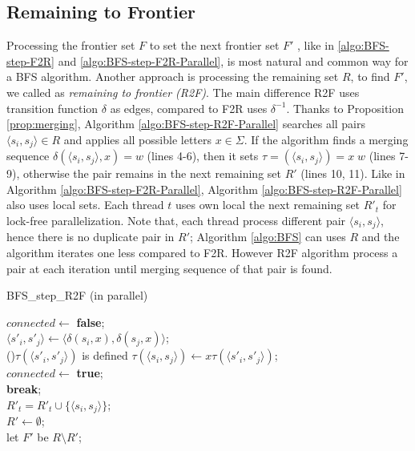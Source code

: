 \documentclass[12pt]{article}
\begin{document}
\subsection{Remaining to Frontier}
\label{sec:BFS-R2F-parallel}

Processing the frontier set $F$ to set the next frontier set $F'$ , like in \ref{algo:BFS-step-F2R} and \ref{algo:BFS-step-F2R-Parallel}, is most natural and common way for a BFS algorithm. Another approach is processing the remaining set $R$, to find $F'$, we called as \textit{remaining to frontier (R2F)}. The main difference R2F uses transition function $\delta$ as edges, compared to F2R uses $\delta^{-1}$. Thanks to Proposition \ref{prop:merging}, Algorithm \ref{algo:BFS-step-R2F-Parallel} searches all pairs $\langle s_i,s_j\rangle \in R$ and applies all possible letters $x \in \Sigma$. If the algorithm finds a merging sequence $\delta(\langle s_i,s_j\rangle, x) = w$ (lines 4-6), then it sets $\tau = (\langle s_i,s_j\rangle) = x \; w$ (lines 7-9), otherwise the pair remains in the next remaining set $R'$ (lines 10, 11). Like in Algorithm \ref{algo:BFS-step-F2R-Parallel}, Algorithm \ref{algo:BFS-step-R2F-Parallel} also uses local sets. Each thread $t$ uses own local the next remaining set $R'_t$ for lock-free parallelization. Note that, each thread process different pair $\langle s_i,s_j\rangle$, hence there is no duplicate pair in $R'$; Algorithm \ref{algo:BFS} can uses $R$ and the algorithm iterates one less compared to F2R. However R2F algorithm process a pair at each iteration until merging sequence of that pair is found.

\begin{algorithm}[ht]
	\label{algo:BFS-step-R2F-Parallel}
	\caption{BFS\_step\_R2F (in parallel)}
	
	
		{
			$connected  \longleftarrow $ {\bf false};\\
			{
				$\langle s'_i, s'_j \rangle \longleftarrow \langle \delta(s_i,x),\delta(s_j,x) \rangle$; \\ 

				\If(){$\tau(\langle s'_i, s'_j\rangle)$ is defined}
				{
					$\tau(\langle s_i, s_j\rangle) \longleftarrow x \tau(\langle s'_i, s'_j\rangle)$;\\
					$connected  \longleftarrow $ {\bf true};\\
					{\bf break};\\
				}
			}
			{
					$R'_t = R'_t \cup \{ \langle s_i, s_j\rangle \} $;\\
			}
		}
		$R' \longleftarrow \emptyset$;\\
		let $F'$ be $R \setminus R'$;
\end{algorithm}
\end{document}
